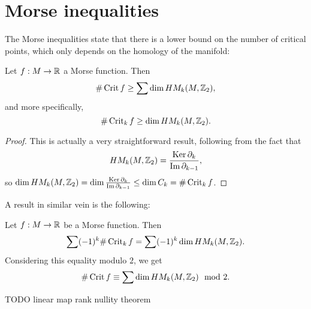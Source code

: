 


\section{Morse inequalities}

The Morse inequalities state that there is a lower bound on the number of critical points, which only depends on the homology of the manifold:
\begin{theorem}
    Let $f: M \to  \R$ a Morse function. Then
    \[
        \# \Crit f \ge \sum \dim \HMf[k]{M, \Z_2}
    ,\] 
    and more specifically,
    \[
        \# \Crit_k f \ge \dim \HMf[k]{M, \Z_2}
    .\] 
\end{theorem}
\begin{proof}
    This is actually a very straightforward result, following from the fact that \[
    \HMf[k]{M, \Z_2} = \frac{\Ker \partial_k}{\Im \partial_{k-1}},
    \] so $\dim \HMf[k]{M, \Z_2} = \dim \frac{\Ker \partial_k}{\Im \partial_{k-1}} \le  \dim C_k = \# \Crit_k f$.
\end{proof}

A result in similar vein is the following:
\begin{theorem}
    Let $f: M \to  \R$ be a Morse function. Then
    \[
        \sum (-1)^{k} \# \Crit_k f = \sum (-1)^{k} \dim \HMf[k]{M, \Z_2} 
    .\] 
    Considering this equality modulo $2$, we get
    \[
        \# \Crit f  \equiv \sum \dim \HMf[k]{M, \Z_2} \mod 2
    .\] 
\end{theorem}
\begin{marginfigure}
    \centering
    \caption{TODO linear map rank nullity theorem}
    \label{fig:linear-map-rank-nullity-theorem}
\end{marginfigure}

